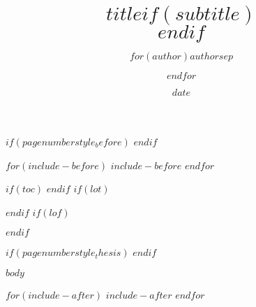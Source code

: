 ﻿\documentclass[$if(fontsize)$$fontsize$,$endif$$if(lang)$$babel-lang$,$endif$$if(papersize)$$papersize$,$endif$$for(classoption)$$classoption$$sep$,$endfor$]{$documentclass$}
\title{$title$$if(subtitle)$\\\vspace{0.5em}{\large $subtitle$}$endif$}
\author{$for(author)$$author$$sep$ \and $endfor$}
\date{$date$}
\begin{document}
$if(pagenumberstyle_before)$
$endif$

$for(include-before)$
$include-before$
$endfor$

$if(toc)$ 
{
\hypersetup{linkcolor=$if(toccolor)$$toccolor$$else$black$endif$}
\setcounter{tocdepth}{$toc-depth$}
\let\cleardoublepage\clearpage
\tableofcontents
} 
$endif$
$if(lot)$
\listoftables
$endif$
$if(lof)$
\listoffigures
$endif$

\fancyhead[LE,RO]{\slshape \rightmark}

\cleardoublepage

$if(pagenumberstyle_thesis)$
$endif$

$body$

$for(include-after)$
$include-after$
$endfor$
\end{document}
